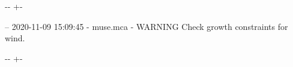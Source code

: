 \documentclass[letterpaper,10pt,english]{sphinxmanual}
\newlength\nbsphinxcodecellspacing
\begin{document}
{

\kern-\sphinxverbatimsmallskipamount\kern-\baselineskip
\kern+\FrameHeightAdjust\kern-\fboxrule
\vspace{\nbsphinxcodecellspacing}

\begin{sphinxVerbatim}[commandchars=\\\{\}]
-- 2020-11-09 15:09:45 - muse.mca - WARNING
Check growth constraints for wind.

\end{sphinxVerbatim}
}

{

\kern-\sphinxverbatimsmallskipamount\kern-\baselineskip
\kern+\FrameHeightAdjust\kern-\fboxrule
\vspace{\nbsphinxcodecellspacing}

}
\end{document}
